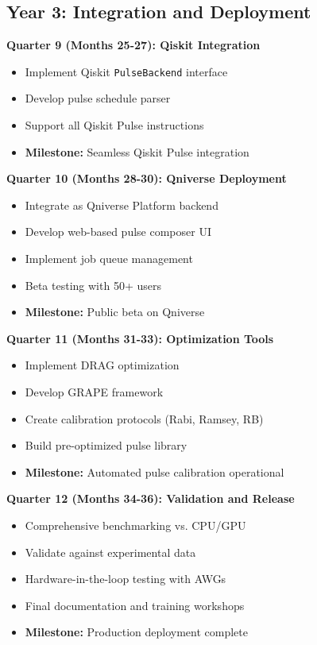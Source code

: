 \documentclass[12pt,a4paper]{article}
\begin{document}
\subsection{Year 3: Integration and Deployment}

\textbf{Quarter 9 (Months 25-27): Qiskit Integration}
\begin{itemize}[noitemsep]
    \item Implement Qiskit \texttt{PulseBackend} interface
    \item Develop pulse schedule parser
    \item Support all Qiskit Pulse instructions
    \item \textbf{Milestone:} Seamless Qiskit Pulse integration
\end{itemize}

\textbf{Quarter 10 (Months 28-30): Qniverse Deployment}
\begin{itemize}[noitemsep]
    \item Integrate as Qniverse Platform backend
    \item Develop web-based pulse composer UI
    \item Implement job queue management
    \item Beta testing with 50+ users
    \item \textbf{Milestone:} Public beta on Qniverse
\end{itemize}

\textbf{Quarter 11 (Months 31-33): Optimization Tools}
\begin{itemize}[noitemsep]
    \item Implement DRAG optimization
    \item Develop GRAPE framework
    \item Create calibration protocols (Rabi, Ramsey, RB)
    \item Build pre-optimized pulse library
    \item \textbf{Milestone:} Automated pulse calibration operational
\end{itemize}

\textbf{Quarter 12 (Months 34-36): Validation and Release}
\begin{itemize}[noitemsep]
    \item Comprehensive benchmarking vs. CPU/GPU
    \item Validate against experimental data
    \item Hardware-in-the-loop testing with AWGs
    \item Final documentation and training workshops
    \item \textbf{Milestone:} Production deployment complete
\end{itemize}
\end{document}
